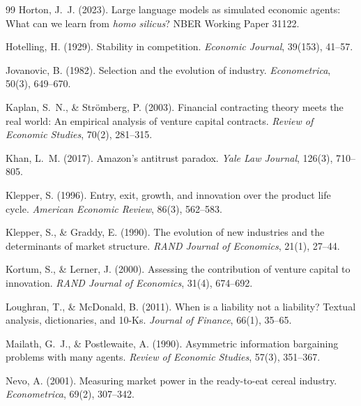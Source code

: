 \documentclass[11pt]{article}
\begin{document}
\begin{thebibliography}{99}
Horton, J.~J. (2023).
\newblock Large language models as simulated economic agents: What can we learn from \emph{homo silicus}?
\newblock NBER Working Paper 31122.

Hotelling, H. (1929).
\newblock Stability in competition.
\newblock \emph{Economic Journal}, 39(153), 41--57.

Jovanovic, B. (1982).
\newblock Selection and the evolution of industry.
\newblock \emph{Econometrica}, 50(3), 649--670.

Kaplan, S.~N., \& Str\"omberg, P. (2003).
\newblock Financial contracting theory meets the real world: An empirical analysis of venture capital contracts.
\newblock \emph{Review of Economic Studies}, 70(2), 281--315.

Khan, L.~M. (2017).
\newblock Amazon's antitrust paradox.
\newblock \emph{Yale Law Journal}, 126(3), 710--805.

Klepper, S. (1996).
\newblock Entry, exit, growth, and innovation over the product life cycle.
\newblock \emph{American Economic Review}, 86(3), 562--583.

Klepper, S., \& Graddy, E. (1990).
\newblock The evolution of new industries and the determinants of market structure.
\newblock \emph{RAND Journal of Economics}, 21(1), 27--44.

Kortum, S., \& Lerner, J. (2000).
\newblock Assessing the contribution of venture capital to innovation.
\newblock \emph{RAND Journal of Economics}, 31(4), 674--692.

Loughran, T., \& McDonald, B. (2011).
\newblock When is a liability not a liability? Textual analysis, dictionaries, and 10-Ks.
\newblock \emph{Journal of Finance}, 66(1), 35--65.

Mailath, G.~J., \& Postlewaite, A. (1990).
\newblock Asymmetric information bargaining problems with many agents.
\newblock \emph{Review of Economic Studies}, 57(3), 351--367.

Nevo, A. (2001).
\newblock Measuring market power in the ready-to-eat cereal industry.
\newblock \emph{Econometrica}, 69(2), 307--342.


\end{thebibliography}
\end{document}
